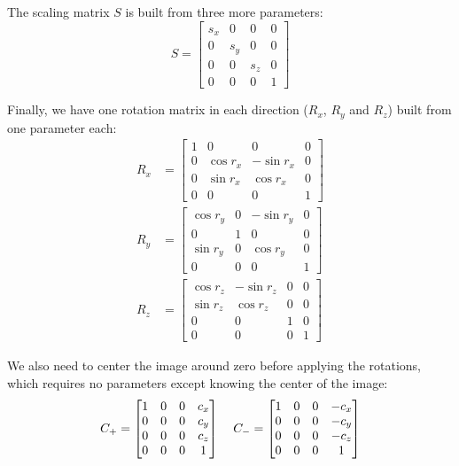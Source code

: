 The scaling matrix $S$ is built from three more parameters:
\begin{equation*}
    S = 
    \begin{bmatrix}
        s_x & 0 & 0 & 0 \\
        0 & s_y & 0 & 0 \\
        0 & 0 & s_z & 0 \\ 
        0 & 0 & 0 & 1
    \end{bmatrix}
\end{equation*}

Finally, we have one rotation matrix in each direction ($R_x$, $R_y$ and $R_z$) built from one parameter each:
\begin{align*}
    R_x &= 
    \begin{bmatrix}
        1 & 0 & 0 & 0 \\
        0 & \cos{r_x} & -\sin{r_x} & 0 \\
        0 & \sin{r_x} & \cos{r_x} & 0 \\ 
        0 & 0 & 0 & 1
    \end{bmatrix} \\
    R_y &= 
    \begin{bmatrix}
        \cos{r_y} & 0 & - \sin{r_y} & 0 \\
        0 & 1 & 0 & 0 \\
        \sin{r_y} & 0 & \cos{r_y} & 0 \\ 
        0 & 0 & 0 & 1
    \end{bmatrix} \\
    R_z &= 
    \begin{bmatrix}
        \cos{r_z} & -\sin{r_z} & 0 & 0 \\
        \sin{r_z} & \cos{r_z} & 0 & 0 \\
        0 & 0 & 1 & 0 \\ 
        0 & 0 & 0 & 1
    \end{bmatrix}
\end{align*}

We also need to center the image around zero before applying the rotations, which requires no parameters except knowing the center of the image:
\begin{equation*}
    C_+ = 
    \begin{bmatrix}
        1 & 0 & 0 & c_x \\
        0 & 0 & 0 & c_y \\
        0 & 0 & 0 & c_z \\ 
        0 & 0 & 0 & 1
    \end{bmatrix}
    \mkern20mu
    C_- = 
    \begin{bmatrix}
        1 & 0 & 0 & -c_x \\
        0 & 0 & 0 & -c_y \\
        0 & 0 & 0 & -c_z \\ 
        0 & 0 & 0 & 1
    \end{bmatrix}
\end{equation*}

